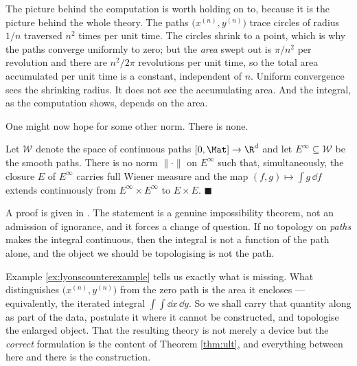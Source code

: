 The picture behind the computation is worth holding on to, because it is the picture behind the
whole theory. The paths $\bigl(x^{(n)},y^{(n)}\bigr)$ trace circles of radius $1/n$ traversed $n^2$
times per unit time. The circles shrink to a point, which is why the paths converge uniformly to
zero; but the \emph{area} swept out is $\pi/n^2$ per revolution and there are $n^2/2\pi$
revolutions per unit time, so the total area accumulated per unit time is a constant, independent
of $n$. Uniform convergence sees the shrinking radius. It does not see the accumulating area. And
the integral, as the computation shows, depends on the area.

One might now hope for some other norm. There is none.

\begin{proposition}[Lyons]\label{prop:nonorm}
Let $\mathcal{W}$ denote the space of continuous paths $[0,\Mat]\to\R^d$ and let
$E^\infty \subseteq \mathcal{W}$ be the smooth paths. There is no norm $\lVert\cdot\rVert$ on
$E^\infty$ such that, simultaneously, the closure $E$ of $E^\infty$ carries full Wiener measure and
the map $(f,g)\mapsto\int g\,\dd f$ extends continuously from $E^\infty\times E^\infty$ to
$E\times E$. \hfill $\blacksquare$
\end{proposition}

A proof is given in \cite[Ch.\ 1]{frizhairer2020}. The statement is a genuine impossibility
theorem, not an admission of ignorance, and it forces a change of question. If no topology on
\emph{paths} makes the integral continuous, then the integral is not a function of the path alone,
and the object we should be topologising is not the path.

Example \ref{ex:lyonscounterexample} tells us exactly what is missing. What distinguishes
$\bigl(x^{(n)},y^{(n)}\bigr)$ from the zero path is the area it encloses --- equivalently, the
iterated integral $\int\!\!\int \dd x\,\dd y$. So we shall carry that quantity along as part of the
data, postulate it where it cannot be constructed, and topologise the enlarged object. That the
resulting theory is not merely a device but the \emph{correct} formulation is the content of
Theorem \ref{thm:ult}, and everything between here and there is the construction.

\medskip

